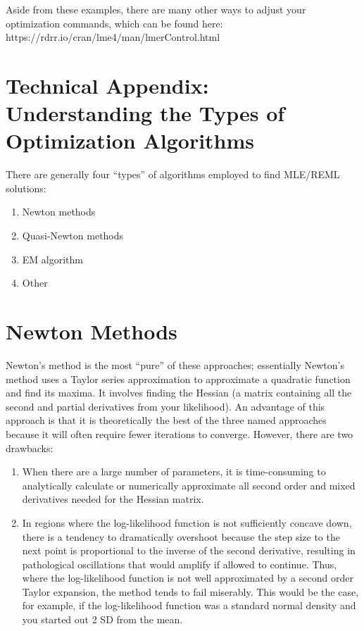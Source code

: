 \documentclass[
  letterpaper,
  DIV=11,
  numbers=noendperiod]{scrreprt}
\begin{document}
Aside from these examples, there are many other ways to adjust your
optimization commands, which can be found here:
https://rdrr.io/cran/lme4/man/lmerControl.html

\section{Technical Appendix: Understanding the Types of Optimization
Algorithms}\label{technical-appendix-understanding-the-types-of-optimization-algorithms}

There are generally four ``types'' of algorithms employed to find
MLE/REML solutions:

\begin{enumerate}
\item Newton methods 
\item Quasi-Newton methods
\item EM algorithm 
\item Other
\end{enumerate}

\section{Newton Methods}\label{newton-methods}

Newton's method is the most ``pure'' of these approaches; essentially
Newton's method uses a Taylor series approximation to approximate a
quadratic function and find its maxima. It involves finding the Hessian
(a matrix containing all the second and partial derivatives from your
likelihood). An advantage of this approach is that it is theoretically
the best of the three named approaches because it will often require
fewer iterations to converge. However, there are two drawbacks:

\begin{enumerate}
\item When there are a large number of parameters, it is time-consuming to analytically calculate or numerically approximate all second order and mixed derivatives needed for the Hessian matrix.
\item In regions where the log-likelihood function is not sufficiently concave down, there is a tendency to dramatically overshoot because the step size to the next point is proportional to the inverse of the second derivative, resulting in pathological oscillations that would amplify if allowed to continue. Thus, where the log-likelihood function is not well approximated by a second order Taylor expansion, the method tends to fail miserably. This would be the case, for example, if the log-likelihood function was a standard normal density and you started out 2 SD from the mean.
\end{enumerate}
\end{document}
